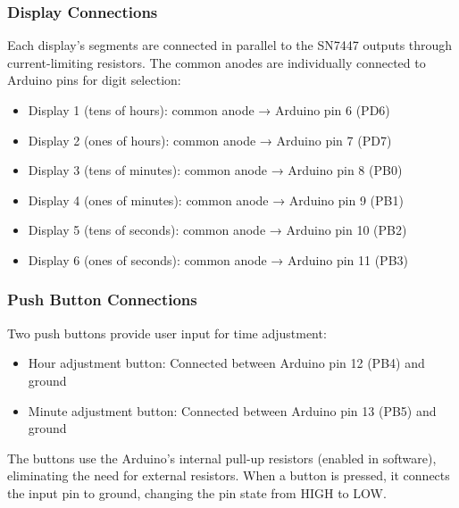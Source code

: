 \documentclass{article}
\begin{document}
\subsubsection{Display Connections}
Each display's segments are connected in parallel to the SN7447 outputs through current-limiting resistors. The common anodes are individually connected to Arduino pins for digit selection:
\begin{itemize}
\item Display 1 (tens of hours): common anode → Arduino pin 6 (PD6)
\item Display 2 (ones of hours): common anode → Arduino pin 7 (PD7)
\item Display 3 (tens of minutes): common anode → Arduino pin 8 (PB0)
\item Display 4 (ones of minutes): common anode → Arduino pin 9 (PB1)
\item Display 5 (tens of seconds): common anode → Arduino pin 10 (PB2)
\item Display 6 (ones of seconds): common anode → Arduino pin 11 (PB3)
\end{itemize}

\subsubsection{Push Button Connections}
Two push buttons provide user input for time adjustment:
\begin{itemize}
\item Hour adjustment button: Connected between Arduino pin 12 (PB4) and ground
\item Minute adjustment button: Connected between Arduino pin 13 (PB5) and ground
\end{itemize}

The buttons use the Arduino's internal pull-up resistors (enabled in software), eliminating the need for external resistors. When a button is pressed, it connects the input pin to ground, changing the pin state from HIGH to LOW.
\end{document}
